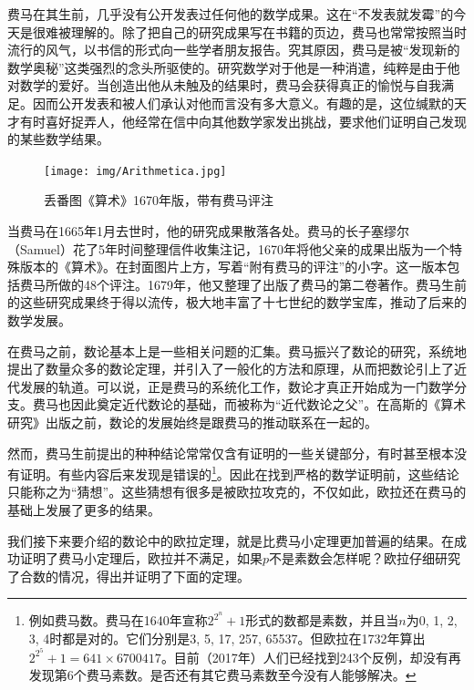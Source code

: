 \documentclass[b5paper]{ctexart}
\begin{document}
费马在其生前，几乎没有公开发表过任何他的数学成果。这在“不发表就发霉”的今天是很难被理解的。除了把自己的研究成果写在书籍的页边，费马也常常按照当时流行的风气，以书信的形式向一些学者朋友报告。究其原因，费马是被“发现新的数学奥秘”这类强烈的念头所驱使的。研究数学对于他是一种消遣，纯粹是由于他对数学的爱好。当创造出他从未触及的结果时，费马会获得真正的愉悦与自我满足。因而公开发表和被人们承认对他而言没有多大意义\cite{HanXueTao2009}。有趣的是，这位缄默的天才有时喜好捉弄人，他经常在信中向其他数学家发出挑战，要求他们证明自己发现的某些数学结果。

\begin{figure}
 \centering
 \texttt{[image: img/Arithmetica.jpg]}
 \captionsetup{labelformat=empty}
 \caption{丢番图《算术》1670年版，带有费马评注}
 \label{fig:Arithmetica}
\end{figure}

当费马在1665年1月去世时，他的研究成果散落各处。费马的长子塞缪尔（Samuel）花了5年时间整理信件收集注记，1670年将他父亲的成果出版为一个特殊版本的《算术》。在封面图片上方，写着“附有费马的评注”的小字。这一版本包括费马所做的48个评注。1679年，他又整理了出版了费马的第二卷著作。费马生前的这些研究成果终于得以流传，极大地丰富了十七世纪的数学宝库，推动了后来的数学发展。

在费马之前，数论基本上是一些相关问题的汇集。费马振兴了数论的研究，系统地提出了数量众多的数论定理，并引入了一般化的方法和原理，从而把数论引上了近代发展的轨道。可以说，正是费马的系统化工作，数论才真正开始成为一门数学分支。费马也因此奠定近代数论的基础，而被称为“近代数论之父”。在高斯的《算术研究》出版之前，数论的发展始终是跟费马的推动联系在一起的。

然而，费马生前提出的种种结论常常仅含有证明的一些关键部分，有时甚至根本没有证明。有些内容后来发现是错误的\footnote{例如费马数。费马在1640年宣称$2^{2^n}+1$形式的数都是素数，并且当$n$为0, 1, 2, 3, 4时都是对的。它们分别是3, 5, 17, 257, 65537。但欧拉在1732年算出$2^{2^5} + 1 = 641 \times 6700417$。目前（2017年）人们已经找到243个反例，却没有再发现第6个费马素数。是否还有其它费马素数至今没有人能够解决。}。因此在找到严格的数学证明前，这些结论只能称之为“猜想”。这些猜想有很多是被欧拉攻克的，不仅如此，欧拉还在费马的基础上发展了更多的结果。

我们接下来要介绍的数论中的欧拉定理，就是比费马小定理更加普遍的结果。在成功证明了费马小定理后，欧拉并不满足，如果$p$不是素数会怎样呢？欧拉仔细研究了合数的情况，得出并证明了下面的定理。
\end{document}
